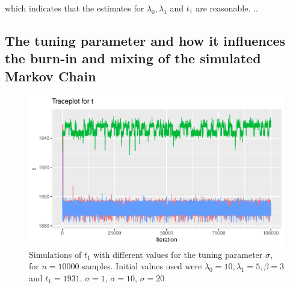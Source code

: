 which indicates that the estimates for $\lambda_0, \lambda_1$ and $t_1$ are reasonable. ..




\subsection{The tuning parameter and how it influences the burn-in and mixing of the simulated Markov Chain}

\begin{figure}[h]
    \centering
    \includegraphics[width = \textwidth]{Images/tuning_stuck_t.pdf}
    \caption{Simulations of $t_1$ with different values for the tuning parameter $\sigma$, for $n = 10000$ samples. Initial values used were $\lambda_0 = 10, \lambda_1 = 5, \beta = 3$ and $t_1 = 1931$.  $\sigma = 1$,  $\sigma= 10$,  $\sigma= 20$}
    \label{fig:tuning_t_single}
\end{figure}

